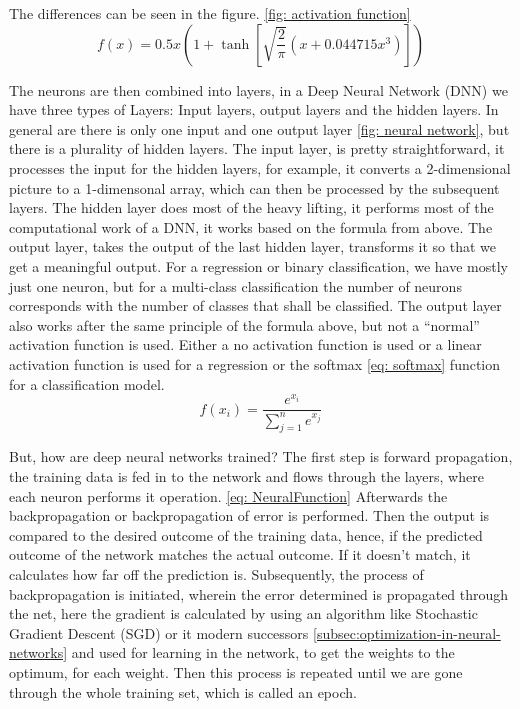 The differences can be seen in the figure. \ref{fig: activation function}
\begin{equation}
    f(x) = 0.5x\left ( 1+\tanh\left [ \sqrt{\frac{2}{\pi}}\left ( x+0.044715x^3 \right ) \right ] \right )
    \label{eq: gelu}
\end{equation}

The neurons are then combined into layers, in a Deep Neural Network (DNN) we have three types of Layers:
Input layers, output layers and the hidden layers.
In general are there is only one input and one output layer \ref{fig: neural network}, but there is a plurality of hidden layers.
The input layer, is pretty straightforward, it processes the input for the hidden layers, for example, it converts a 2-dimensional picture to a 1-dimensonal array,
which can then be processed by the subsequent layers.
The hidden layer does most of the heavy lifting, it performs most of the computational work of a DNN, it works based on the formula from above.
The output layer, takes the output of the last hidden layer, transforms it so that we get a meaningful output.
For a regression or binary classification, we have mostly just one neuron, but for a multi-class classification the number of neurons corresponds with the number of classes that shall be classified.
The output layer also works after the same principle of the formula above, but not a “normal” activation function is used.
Either a no activation function is used or a linear activation function is used for a regression or the softmax \ref{eq: softmax} function for a classification model.
\begin{equation}
    f(x_i) = \frac{e^{x_i}}{\sum^n_{j=1}e^{x_j}}
    \label{eq: softmax}
\end{equation}

But, how are deep neural networks trained? \cite{lecun_deep_2015}
The first step is forward propagation, the training data is fed in to the network and flows through the layers, where each neuron performs it operation. \ref{eq: NeuralFunction}
Afterwards the backpropagation or backpropagation of error is performed. \cite{rumelhart_learning_1986}
Then the output is compared to the desired outcome of the training data, hence, if the predicted outcome of the network matches the actual outcome.
If it doesn't match, it calculates how far off the prediction is.
Subsequently, the process of backpropagation is initiated, wherein the error determined is propagated through the net, here the gradient is calculated by using an algorithm like Stochastic Gradient Descent (SGD) or it modern successors \ref{subsec:optimization-in-neural-networks} and used for learning in the network, to get the weights to the optimum, for each weight.
Then this process is repeated until we are gone through the whole training set, which is called an epoch.
